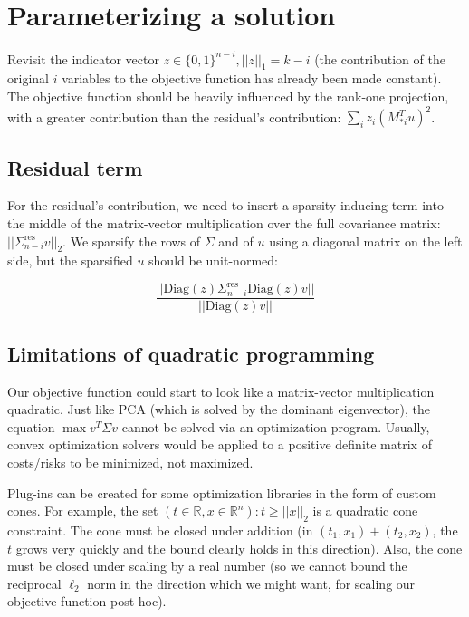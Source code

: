 \documentclass{article}
\begin{document}
\section{Parameterizing a solution}

Revisit the indicator vector $z \in \{0,1\}^{n-i}, ||z||_1 = k-i$ (the contribution of the original $i$ variables to the objective function has already been made constant). The objective function should be heavily influenced by the rank-one projection, with a greater contribution than the residual's contribution: $\sum_i z_i (M_{*i}^T u)^2$.

\subsection{Residual term}

For the residual's contribution, we need to insert a sparsity-inducing term into the middle of the matrix-vector multiplication over the full covariance matrix: $||\Sigma_{n-i}^\text{res} v||_2$. We sparsify the rows of $\Sigma$ and of $u$ using a diagonal matrix on the left side, but the sparsified $u$ should be unit-normed:

$$\frac{|| \text{Diag}(z) \Sigma_{n-i}^\text{res} \text{Diag}(z) v||}{|| \text{Diag}(z) v ||}$$



\subsection{Limitations of quadratic programming}

Our objective function could start to look like a matrix-vector multiplication quadratic. Just like PCA (which is solved by the dominant eigenvector), the equation $\max v^T \Sigma v$ cannot be solved via an optimization program. Usually, convex optimization solvers would be applied to a positive definite matrix of costs/risks to be minimized, not maximized.

Plug-ins can be created for some optimization libraries in the form of custom cones. For example, the set $(t \in \mathbb{R}, x \in \mathbb{R}^n) : t \ge ||x||_2$ is a quadratic cone constraint. The cone must be closed under addition (in $(t_1,x_1)+(t_2,x_2)$, the $t$ grows very quickly and the bound clearly holds in this direction). Also, the cone must be closed under scaling by a real number (so we cannot bound the reciprocal $\ell_2$ norm in the direction which we might want, for scaling our objective function post-hoc).
\end{document}
